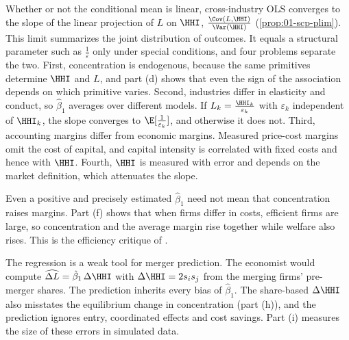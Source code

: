 Whether or not the conditional mean is linear, cross-industry OLS converges to the slope of the linear projection of
$L$ on $\HHI$, $\frac{\Cov(L, \HHI)}{\Var(\HHI)}$ (\cref{prop:01-scp-plim}). This limit
summarizes the joint distribution of outcomes. It equals a structural parameter such as $\frac{1}{\varepsilon}$
only under special conditions, and four problems separate the two. First, concentration is endogenous, because the same primitives determine
$\HHI$ and $L$, and part (d) shows that even the sign of the association depends on which primitive varies.
Second, industries differ in elasticity and conduct, so $\hat\beta_1$ averages over different models. If
$L_k = \frac{\HHI_k}{\varepsilon_k}$ with $\varepsilon_k$ independent of $\HHI_k$, the slope converges to
$\E[\frac{1}{\varepsilon_k}]$, and otherwise it does not. Third, accounting margins differ from economic
margins. Measured price-cost margins omit the cost of capital, and capital intensity is correlated with
fixed costs and hence with $\HHI$. Fourth, $\HHI$ is measured with error and depends on the market definition,
which attenuates the slope.

Even a positive and precisely estimated $\hat\beta_1$ need not mean that concentration raises margins.
Part (f) shows that when firms differ in costs, efficient firms are large, so concentration and the average
margin rise together while welfare also rises. This is the efficiency critique of \citet{Demsetz1973}.

The regression is a weak tool for merger prediction. The economist would compute
$\widehat{\Delta L} = \hat\beta_1\,\Delta\HHI$ with $\Delta\HHI = 2s_is_j$ from the merging firms' pre-merger
shares. The prediction inherits every bias of $\hat\beta_1$. The share-based $\Delta\HHI$ also misstates the
equilibrium change in concentration (part (h)), and the prediction ignores entry, coordinated effects and
cost savings. Part (i) measures the size of these errors in simulated data.

